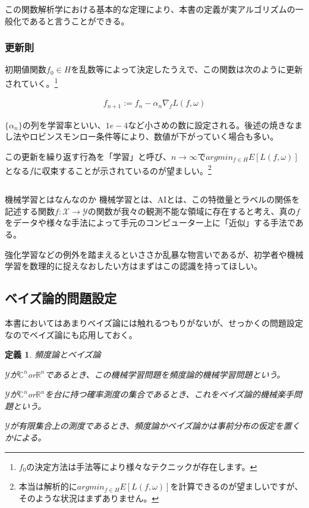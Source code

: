 \documentclass{jsarticle}
\newtheorem{defi}{定義}[section]
\begin{document}
この関数解析学における基本的な定理により、本書の定義が実アルゴリズムの一般化であると言うことができる。

\subsubsection{更新則}

初期値関数$f_0\in H$を乱数等によって決定したうえで、この関数は次のように更新されていく。\footnote{$f_0$の決定方法は手法等により様々なテクニックが存在します。}

\begin{align}
f_{n+1}:=f_n-\alpha_n \nabla_f L(f,\omega)
\end{align}

$\{\alpha_n\}$の列を学習率といい、$1e-4$など小さめの数に設定される。後述の焼きなまし法やロビンスモンロー条件等により、数値が下がっていく場合も多い。

この更新を繰り返す行為を「学習」と呼び、$n\to \infty$で$argmin_{f\in H} E[L(f,\omega)]$となる$f$に収束することが示されているのが望ましい。\footnote{本当は解析的に$argmin_{f\in H} E[L(f,\omega)]$を計算できるのが望ましいですが、そのような状況はまずありません。}

\subsection{}

\begin{itembox}[l]{機械学習とはなんなのか}
機械学習とは、AIとは、この特徴量とラベルの関係を記述する関数$f:\mathcal{X}\to \mathcal{Y}$の関数が我々の観測不能な領域に存在すると考え、真の$f$をデータや様々な手法によって手元のコンピューター上に「近似」する手法である。
\end{itembox}

強化学習などの例外を踏まえるといささか乱暴な物言いであるが、初学者や機械学習を数理的に捉えなおしたい方はまずはこの認識を持ってほしい。


\subsection{ベイズ論的問題設定}

本書においてはあまりベイズ論には触れるつもりがないが、せっかくの問題設定なのでベイズ論にも応用しておく。

\begin{defi} 頻度論とベイズ論

$\mathcal{Y}$が$\mathbb{C}^n$or$\mathbb{R}^n$であるとき、この機械学習問題を頻度論的機械学習問題という。

$\mathcal{Y}$が$\mathbb{C}^n$or$\mathbb{R}^n$を台に持つ確率測度の集合であるとき、これをベイズ論的機械楽手問題という。

$\mathcal{Y}$が有限集合上の測度であるとき、頻度論かベイズ論かは事前分布の仮定を置くかによる。

\end{defi}
\end{document}
